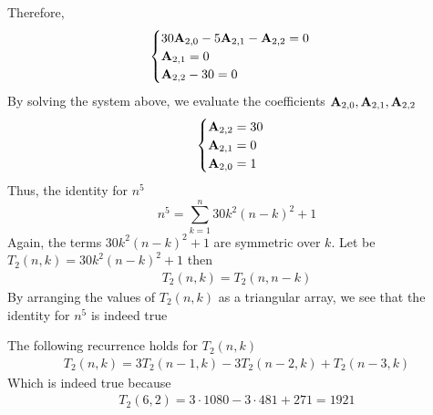 Therefore,
\begin{equation*}
    \begin{cases}
        30 {\mathbf{A}} \sb{2,0} - 5 {\mathbf{A}} \sb{2,1} - {\mathbf{A}} \sb{2,2} = 0 \\
        {\mathbf{A}} \sb{2,1} = 0 \\
        {\mathbf{A}} \sb{2,2} - 30 = 0
    \end{cases}
\end{equation*}
By solving the system above, we evaluate the coefficients ${\mathbf{A}} \sb{2,0}, {\mathbf{A}} \sb{2,1}, {\mathbf{A}} \sb{2,2}$
\begin{equation*}
    \begin{cases}
        {\mathbf{A}} \sb{2,2} = 30 \\
        {\mathbf{A}} \sb{2,1} = 0 \\
        {\mathbf{A}} \sb{2,0} = 1
    \end{cases}
\end{equation*}
Thus, the identity for $n^5$
\begin{equation*}
    n^5 = \sum_{k=1}^{n} 30k^2(n-k)^2 + 1
\end{equation*}
Again, the terms $30k^2(n-k)^2 + 1$ are symmetric over $k$.
Let be $T_2 (n,k) = 30k^2(n-k)^2 + 1$ then
\begin{align*}
    T_2 (n,k) = T_2 (n,n-k)
\end{align*}
By arranging the values of $T_{2} (n,k)$ as a triangular array, we see that the identity for $n^5$ is indeed true

The following recurrence holds for $T_2 (n,k)$
\begin{align*}
    T_2 (n, k) = 3T_2(n-1, k) - 3T_2(n-2, k) + T_2(n-3, k)
\end{align*}
Which is indeed true because
\begin{align*}
    T_2 (6,2) = 3 \cdot 1080 - 3 \cdot 481 + 271 = 1921
\end{align*}

